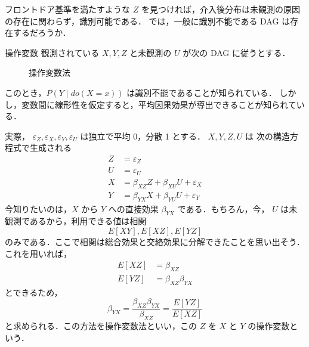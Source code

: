 \documentclass[uplatex, dvipdfmx]{jsarticle}
\begin{document}
フロントドア基準を満たすような $Z$ を見つければ，介入後分布は未観測の原因の存在に関わらず，識別可能である．
では，一般に識別不能である DAG は存在するだろうか．

\begin{exm}{操作変数}
  観測されている $X, Y, Z$ と未観測の $U$ が次の DAG に従うとする．
  \begin{figure}[H]
    \centering
    \caption{操作変数法}
  \end{figure}
  このとき，$P(Y \mid do(X=x))$ は識別不能であることが知られている．
  しかし，変数間に線形性を仮定すると，平均因果効果が導出できることが知られている．
  
  実際，
  $\varepsilon_Z, \varepsilon_X, \varepsilon_Y, \varepsilon_U$ は独立で平均 0，分散 1 とする．
  $X, Y, Z, U$ は 次の構造方程式で生成される
  \begin{align}
    Z &= \varepsilon_Z \\
    U &= \varepsilon_U \\
    X &= \beta_{XZ} Z + \beta_{XU} U + \varepsilon_X \\
    Y &= \beta_{YX} X + \beta_{YU} U + \varepsilon_Y
  \end{align}
  今知りたいのは，$X$ から $Y$ への直接効果 $\beta_{YX}$ である．もちろん，今， $U$ は未観測であるから，利用できる値は相関
  \begin{equation}
    E[XY], E[XZ], E[YZ]
  \end{equation}
  のみである．ここで相関は総合効果と交絡効果に分解できたことを思い出そう．
  これを用いれば，
  \begin{align}
    E[XZ] &= \beta_{XZ} \\
    E[YZ] &= \beta_{XZ}\beta_{YX}
  \end{align}
  とできるため，
  \begin{equation}
    \beta_{YX} = \frac{\beta_{XZ}\beta_{YX}}{\beta_{XZ}} = \frac{E[YZ]}{E[XZ]}
  \end{equation}
  と求められる．この方法を操作変数法といい，この $Z$ を $X$ と $Y$ の操作変数という．
\end{exm}
\end{document}
